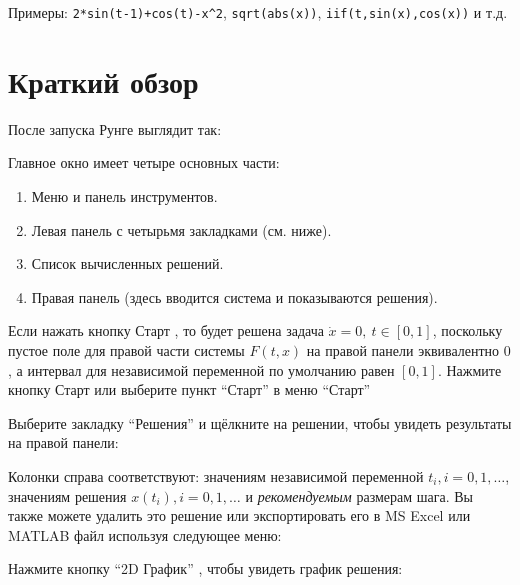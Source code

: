 \documentclass[12pt]{article}
\begin{document}
Примеры: \texttt{2*sin(t-1)+cos(t)-x^2}, \texttt{sqrt(abs(x))}, \texttt{iif(t,sin(x),cos(x))} и т.д.



\section{Краткий обзор}

После запуска Рунге выглядит так:


Главное окно имеет четыре основных части:
\begin{enumerate}
\item Меню и панель инструментов.
\item Левая панель с четырьмя закладками (см. ниже).
\item Список вычисленных решений.
\item Правая панель (здесь вводится система и показываются решения).
\end{enumerate}

Если нажать кнопку Старт ,
то будет решена задача \(\dot x=0,\ t\in[0,1]\),
поскольку пустое поле для правой части системы \(F(t,x)\) 
на правой панели эквивалентно \(0\),
а интервал для независимой переменной по умолчанию равен \([0,1]\). 
Нажмите кнопку Старт 
или выберите пункт ``Старт'' в меню ``Старт''


Выберите закладку ``Решения'' 
и щёлкните на решении, чтобы увидеть результаты на правой панели:


Колонки справа соответствуют: значениям независимой переменной \(t_i, i=0,1,\dots\), 
значениям решения \(x(t_i), i=0,1,\dots\) и \textit{рекомендуемым} размерам шага.
Вы также можете удалить это решение или экспортировать его в MS Excel или MATLAB файл используя следующее меню:


Нажмите кнопку ``2D График'' , 
чтобы увидеть график решения:




\end{document}
